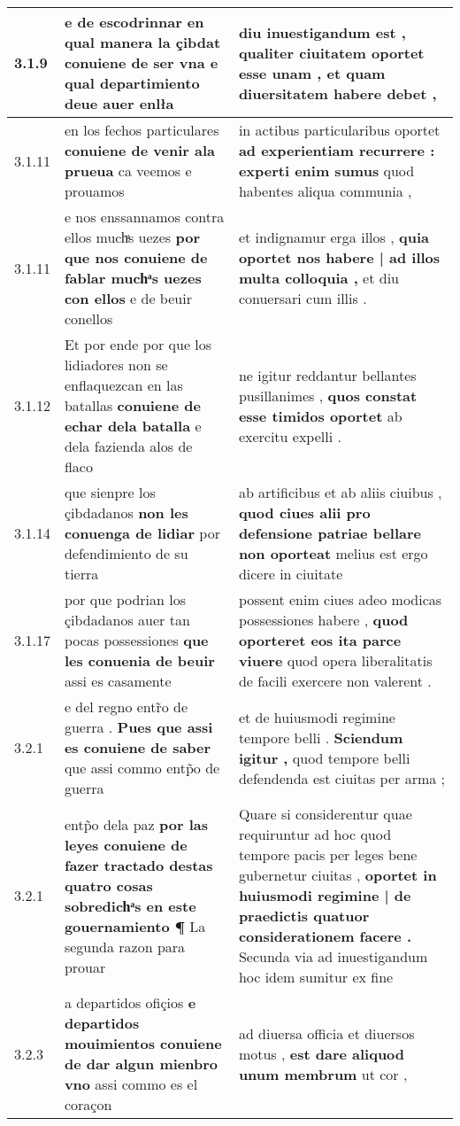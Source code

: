 \begin{tabular}{|p{1cm}|p{6.5cm}|p{6.5cm}|}
3.1.9 & e de escodrinnar \textbf{ en qual manera la çibdat conuiene de ser vna } e qual departimiento deue auer enlła & diu inuestigandum est , \textbf{ qualiter ciuitatem oportet esse unam , } et quam diuersitatem habere debet , \\\hline
3.1.11 & en los fechos particulares \textbf{ conuiene de venir ala prueua } ca veemos e prouamos & in actibus particularibus oportet \textbf{ ad experientiam recurrere : experti enim sumus } quod habentes aliqua communia , \\\hline
3.1.11 & e nos enssannamos contra ellos muchͣs uezes \textbf{ por que nos conuiene de fablar muchͣs uezes con ellos } e de beuir conellos & et indignamur erga illos , \textbf{ quia oportet nos habere | ad illos multa colloquia , } et diu conuersari cum illis . \\\hline
3.1.12 & Et por ende por que los lidiadores non se enflaquezcan en las batallas \textbf{ conuiene de echar dela batalla } e dela fazienda alos de flaco & ne igitur reddantur bellantes pusillanimes , \textbf{ quos constat esse timidos oportet } ab exercitu expelli . \\\hline
3.1.14 & que sienpre los çibdadanos \textbf{ non les conuenga de lidiar } por defendimiento de su tierra & ab artificibus et ab aliis ciuibus , \textbf{ quod ciues alii pro defensione patriae bellare non oporteat } melius est ergo dicere in ciuitate \\\hline
3.1.17 & por que podrian los çibdadanos auer tan pocas possessiones \textbf{ que les conuenia de beuir } assi es casamente & possent enim ciues adeo modicas possessiones habere , \textbf{ quod oporteret eos ita parce viuere } quod opera liberalitatis de facili exercere non valerent . \\\hline
3.2.1 & e del regno entr̃o de guerra . \textbf{ Pues que assi es conuiene de saber } que assi commo entp̃o de guerra & et de huiusmodi regimine tempore belli . \textbf{ Sciendum igitur , } quod tempore belli defendenda est ciuitas per arma ; \\\hline
3.2.1 & entp̃o dela paz \textbf{ por las leyes conuiene de fazer tractado destas quatro cosas sobredichͣs en este gouernamiento ¶ } La segunda razon para prouar & Quare si considerentur quae requiruntur ad hoc quod tempore pacis per leges bene gubernetur ciuitas , \textbf{ oportet in huiusmodi regimine | de praedictis quatuor considerationem facere . } Secunda via ad inuestigandum hoc idem sumitur ex fine \\\hline
3.2.3 & a departidos ofiçios \textbf{ e departidos mouimientos conuiene de dar algun mienbro vno } assi commo es el coraçon & ad diuersa officia et diuersos motus , \textbf{ est dare aliquod unum membrum } ut cor , \\\hline

\end{tabular}

